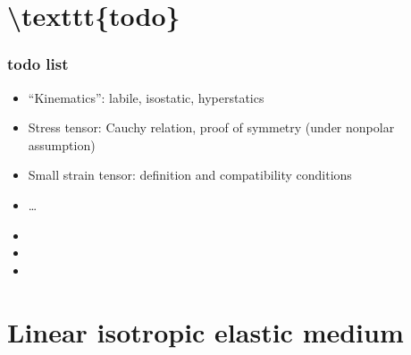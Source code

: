 \documentclass[letterpaper,10pt,english]{jupyterBook}
\begin{document}
\section{\textbackslash{}texttt\{todo\}}
\label{\detokenize{ch/solids/small-displacements-statics:texttt-todo}}\subsubsection*{todo list}
\begin{itemize}
\item {} 
\sphinxAtStartPar
“Kinematics”: labile, isostatic, hyperstatics

\item {} 
\sphinxAtStartPar
Stress tensor: Cauchy relation, proof of symmetry (under non\sphinxhyphen{}polar assumption)

\item {} 
\sphinxAtStartPar
Small strain tensor: definition and compatibility conditions

\item {} 
\sphinxAtStartPar
…

\end{itemize}
\begin{itemize}
\item {} 
\sphinxAtStartPar
{}

\item {} 
\sphinxAtStartPar
{}

\item {} 
\sphinxAtStartPar
{}

\end{itemize}


\section{Linear isotropic elastic medium}
\label{\detokenize{ch/solids/small-displacements-statics:linear-isotropic-elastic-medium}}\label{\detokenize{ch/solids/small-displacements-statics:solid-mechanics-intro-small-displacements-statics-elastic-medium}}
\end{document}
